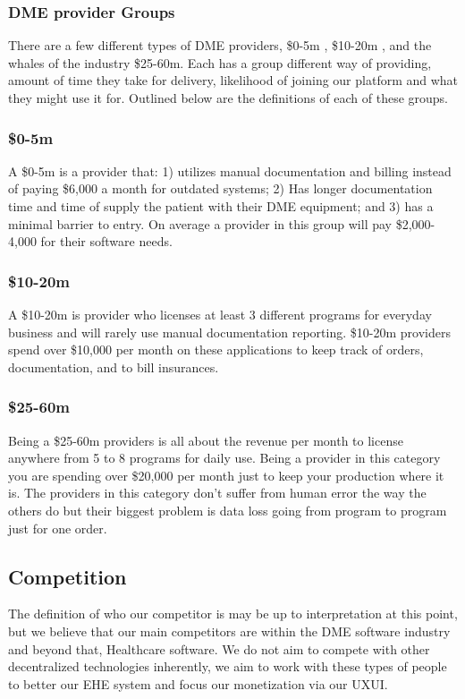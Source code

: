 \documentclass[preprint,pre,floats,aps,amsmath,amssymb]{revtex4-1}
\begin{document}
  \subsubsection{DME provider Groups}
  There are a few different types of DME providers, \$0-5m , \$10-20m , and the whales of the industry \$25-60m. Each has a group different way of providing, amount of time they take for delivery, likelihood of joining our platform and what they might use it for. Outlined below are the definitions of each of these groups.


  \subsubsection{\$0-5m}
  A \$0-5m is a provider that: 1) utilizes manual documentation and billing instead of paying \$6,000 a month for outdated systems; 2) Has longer documentation time and time of supply the patient with their DME equipment; and 3) has a minimal barrier to entry. On average a provider in this group will pay \$2,000-4,000 for their software needs.

  \subsubsection{\$10-20m}
  A \$10-20m is provider who licenses at least 3 different programs for everyday business and will rarely use manual documentation reporting. \$10-20m providers spend over \$10,000 per month on these applications to keep track of orders, documentation, and to bill insurances.

  \subsubsection{\$25-60m}
  Being a \$25-60m providers is all about the revenue per month to license anywhere from 5 to 8 programs for daily use. Being a provider in this category you are spending over \$20,000 per month just to keep your production where it is. The providers in this category don’t suffer from human error the way the others do but their biggest problem is data loss going from program to program just for one order.

\subsection{Competition}
The definition of who our competitor is may be up to interpretation at this point, but we believe that our main competitors are within the DME software industry and beyond that, Healthcare software. We do not aim to compete with other decentralized technologies inherently, we aim to work with these types of people to better our EHE system and focus our monetization via our UXUI.
\end{document}
